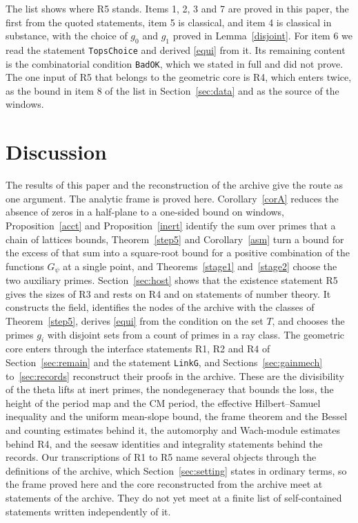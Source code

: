 \documentclass[11pt,letterpaper]{article}
\numberwithin{equation}{section}
\begin{document}
The list shows where R5 stands. Items 1, 2, 3 and 7 are proved in this paper, the first from the quoted statements, item 5 is classical, and item 4 is classical in substance, with the choice of $g_0$ and $g_1$ proved in Lemma~\ref{disjoint}. For item 6 we read the statement \texttt{TopsChoice} and derived \eqref{equi} from it. Its remaining content is the combinatorial condition \texttt{BadOK}, which we stated in full and did not prove. The one input of R5 that belongs to the geometric core is R4, which enters twice, as the bound in item 8 of the list in Section~\ref{sec:data} and as the source of the windows.

\section{Discussion}\label{sec:discussion}

The results of this paper and the reconstruction of the archive give the route as one argument. The analytic frame is proved here. Corollary~\ref{corA} reduces the absence of zeros in a half-plane to a one-sided bound on windows, Proposition~\ref{acct} and Proposition~\ref{inert} identify the sum over primes that a chain of lattices bounds, Theorem~\ref{step5} and Corollary~\ref{asm} turn a bound for the excess of that sum into a square-root bound for a positive combination of the functions $G_\psi$ at a single point, and Theorems~\ref{stage1} and~\ref{stage2} choose the two auxiliary primes. Section~\ref{sec:host} shows that the existence statement R5 gives the sizes of R3 and rests on R4 and on statements of number theory. It constructs the field, identifies the nodes of the archive with the classes of Theorem~\ref{step5}, derives \eqref{equi} from the condition on the set $T$, and chooses the primes $g_i$ with disjoint sets from a count of primes in a ray class. The geometric core enters through the interface statements R1, R2 and R4 of Section~\ref{sec:remain} and the statement \texttt{LinkG}, and Sections~\ref{sec:gainmech} to~\ref{sec:records} reconstruct their proofs in the archive. These are the divisibility of the theta lifts at inert primes, the nondegeneracy that bounds the loss, the height of the period map and the CM period, the effective Hilbert--Samuel inequality and the uniform mean-slope bound, the frame theorem and the Bessel and counting estimates behind it, the automorphy and Wach-module estimates behind R4, and the seesaw identities and integrality statements behind the records. Our transcriptions of R1 to R5 name several objects through the definitions of the archive, which Section~\ref{sec:setting} states in ordinary terms, so the frame proved here and the core reconstructed from the archive meet at statements of the archive. They do not yet meet at a finite list of self-contained statements written independently of it.
\end{document}
